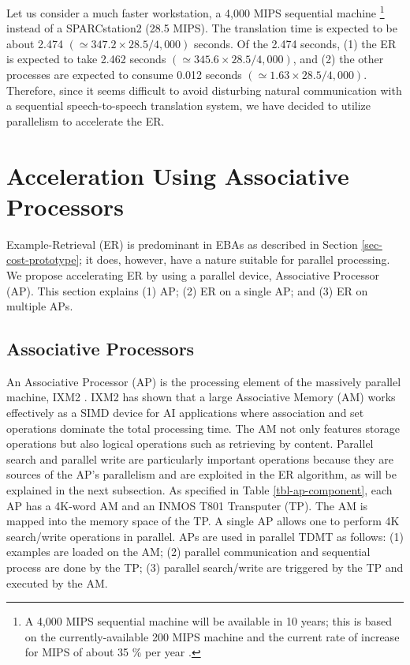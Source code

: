 Let us consider a much faster workstation, a 4,000  MIPS  sequential machine
\footnote{
 A 4,000  MIPS  sequential machine will be available in 10 years;
this is based on the currently-available 200  MIPS  machine and
the current rate of increase for MIPS of about 35 \% 
per year \cite{Hennessy90}.
} instead of a SPARCstation2 (28.5 MIPS).
 The translation time
is expected to be about 2.474 $(\simeq 347.2\times
28.5/4,000)$ seconds.
Of the  2.474 seconds, 
(1) the ER is expected to take 2.462 seconds
$(\simeq 345.6\times 28.5/4,000)$, 
and (2) the other processes are expected to consume  0.012 
seconds $(\simeq 1.63\times 28.5/4,000)$.
Therefore, since it seems difficult to avoid
disturbing natural communication 
with a sequential speech-to-speech translation system, 
we have decided to utilize parallelism to accelerate the ER.

\section{Acceleration Using Associative Processors}\label{sec-tdmt-ap}

Example-Retrieval (ER) is predominant in EBAs as described 
in Section \ref{sec-cost-prototype}; it does, however, 
have a nature suitable for parallel processing.
We propose accelerating ER by 
using a parallel device, Associative Processor (AP).
This section explains (1) AP; (2) ER on a single AP; 
and (3) ER on multiple APs.

\subsection{Associative Processors}\label{mp-ebmt}

An Associative Processor (AP) is the processing element of the massively 
parallel
machine, IXM2 \cite{Higuchi91a}.
IXM2 has shown that a large Associative Memory (AM) 
works effectively as a SIMD device for AI 
applications where 
association and set operations dominate the total processing time.
 The AM not only features storage operations but also logical
operations such as retrieving by content. 
 Parallel search and parallel write are particularly
important operations because they are sources of the AP's parallelism
and are exploited in the ER algorithm, as will be 
explained in the next subsection. 
As specified in Table \ref{tbl-ap-component},
each AP has a 4K-word AM and an INMOS T801 Transputer (TP).
The AM is mapped into the memory space of the TP.
A single AP allows one to perform 4K search/write operations in parallel.
APs are used in parallel TDMT as follows:
(1) examples are loaded on the AM; (2) parallel communication 
and sequential process are done by the TP; (3) parallel search/write are 
triggered by the TP and executed by the AM.


